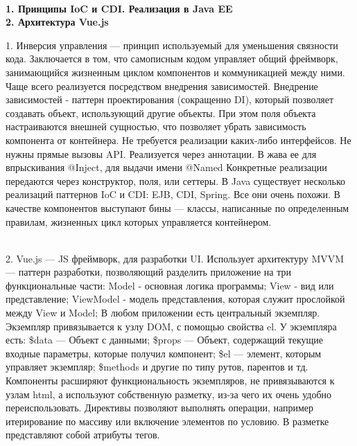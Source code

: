 \documentclass{article}
\newcommand{\bil}[4]{%
    \begin{minipage}{.3\textwidth}
        \textbf{1. #1} \\
        \textbf{2. #2}

        1. #3
        \\
        2. #4
    \end{minipage}
}
\begin{document}
\\
\bil{Принципы IoC и CDI. Реализация в Java EE}{Архитектура Vue.js}{
    Инверсия управления — принцип используемый для уменьшения связности кода. Заключается в том, что самописным кодом управляет общий фреймворк, занимающийся жизненным циклом компонентов и коммуникацией между ними. Чаще всего реализуется посредством внедрения зависимостей.
    Внедрение зависимостей - паттерн проектирования (сокращенно DI), который позволяет создавать объект, использующий другие объекты. При этом поля объекта настраиваются внешней сущностью, что позволяет убрать зависимость компонента от контейнера.
    Не требуется реализации каких-либо интерфейсов. Не нужны прямые вызовы API. 
    Реализуется через аннотации. В жава ее для впрыскивания @Inject, для выдачи имени @Named
    Конкретные реализации передаются через конструктор, поля, или сеттеры.
    В Java существует несколько реализаций паттернов IoC и CDI: EJB, CDI, Spring. Все они очень похожи. В качестве компонентов выступают бины — классы, написанные по определенным правилам, жизненных цикл которых управляется контейнером.
}{
    Vue.js — JS фреймворк, для разработки UI. Использует архитектуру MVVM — паттерн разработки, позволяющий разделить приложение на три функциональные части:
    Model - основная логика программы;
    View - вид или представление;
    ViewModel - модель представления, которая служит прослойкой между View и Model;
    В любом приложении есть центральный экземпляр.
    Экземпляр привязывается к узлу DOM, с помощью свойства el.
    У экземпляра есть: \$data — Объект с данными; 
    \$props — Объект, содержащий текущие входные параметры, которые получил компонент;
    \$el — элемент, которым управляет экземпляр;
    \$methods и другие по типу рутов, парентов и тд.
    Компоненты расширяют функциональность экземпляров, 
    не привязываются к узлам html, а используют собственную разметку, из-за чего их очень удобно переиспользовать.
    Директивы позволяют выполнять операции, например итерирование по массиву или включение элементов по условию.
    В разметке представляют собой атрибуты тегов.

}
\hfill
\end{document}
